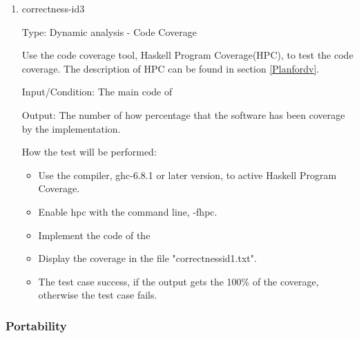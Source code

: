 \documentclass[12pt, titlepage]{article}
\begin{document}
\begin{enumerate} 


\item{correctness-id3\\}

Type: Dynamic analysis - Code Coverage 

Use the code coverage tool, Haskell Program Coverage(HPC), to test the code
coverage. The description of HPC can be found in section \ref{Planfordv}.

Input/Condition: The main code of \progname

Output: The number of how percentage that the software has been coverage by the implementation.

How the test will be performed:

\begin{itemize} 
\item Use the compiler, ghc-6.8.1 or later version, to active Haskell Program
Coverage.
\item Enable hpc with the command line, -fhpc.
\item Implement the code of the \progname
\item Display the coverage in the file "correctnessid1.txt".
\item The test case success, if the output gets the 100\% of the coverage,
otherwise
the test case fails. 
\end{itemize}
\end{enumerate} 


\subsubsection{Portability} 
\end{document}

